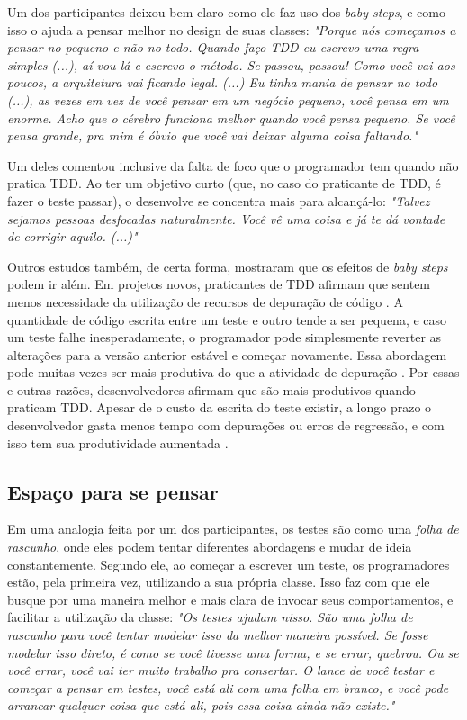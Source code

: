 Um dos participantes deixou bem claro como ele faz uso dos \textit{baby steps}, e como
isso o ajuda a pensar melhor no design de suas classes:
\textit{"Porque nós começamos a pensar no pequeno e não no todo. Quando faço TDD eu escrevo
uma regra simples (...), aí vou lá e escrevo o método. Se passou, passou! Como você vai aos poucos,
a arquitetura vai ficando legal. (...) Eu tinha mania de pensar no todo (...), as vezes
em vez de você pensar em um negócio pequeno, você pensa em um enorme. Acho que o cérebro funciona
melhor quando você pensa pequeno. Se você pensa grande, pra mim é óbvio que você vai deixar
alguma coisa faltando."}

Um deles comentou inclusive da falta de foco que o programador tem quando não pratica TDD.
Ao ter um objetivo curto (que, no caso do praticante de TDD, é fazer o teste passar), o
desenvolve se concentra mais para alcançá-lo:
\textit{"Talvez sejamos pessoas desfocadas naturalmente. Você vê uma coisa e já te dá vontade
de corrigir aquilo. (...)"}

Outros estudos também, de certa forma, mostraram que os efeitos de \textit{baby steps}
podem ir além.
Em projetos novos, praticantes de TDD afirmam que sentem menos necessidade da
utilização de recursos de depuração de código \cite{george-williams-experiment} 
\cite{janzen-arch-improvement}. 
A quantidade de código
escrita entre um teste e outro tende a ser pequena, e caso um teste falhe
inesperadamente, o programador pode simplesmente reverter as alterações para a 
versão anterior estável e começar novamente. Essa abordagem pode muitas vezes
ser mais produtiva do que a atividade de depuração 
\cite{janzen-arch-improvement}. Por essas e outras razões, desenvolvedores afirmam 
que são mais produtivos quando praticam TDD. Apesar de o custo da escrita do teste
existir, a longo prazo o desenvolvedor gasta menos tempo com depurações ou 
erros de regressão, e com isso tem sua produtividade aumentada
\cite{george-e-williams}.

\subsection{Espaço para se pensar}

Em uma analogia feita por um dos participantes, os testes são como uma 
\textit{folha de rascunho}, 
onde eles podem tentar diferentes abordagens e mudar de ideia constantemente. Segundo ele,
ao começar a escrever um teste, os programadores estão, pela primeira vez, utilizando a sua 
própria classe. Isso faz com que ele busque por uma maneira melhor e mais clara de invocar
seus comportamentos, e facilitar a utilização da classe:
\textit{"Os testes ajudam nisso. São uma folha de rascunho para você tentar modelar
isso da melhor maneira possível. Se fosse modelar isso direto, é como se você tivesse
uma forma, e se errar, quebrou. Ou se você errar, você vai ter muito trabalho pra consertar.
O lance de você testar e começar a pensar em testes, você está ali com uma folha em branco,
e você pode arrancar qualquer coisa que está ali, pois essa coisa ainda não existe."}

